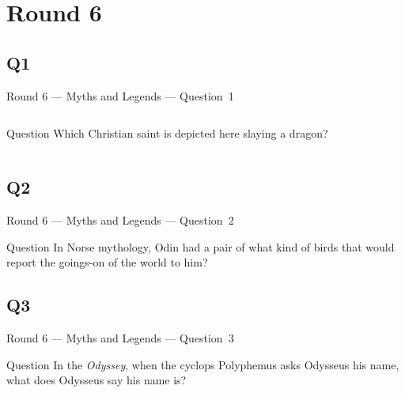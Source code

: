\documentclass[11pt]{beamer}
\begin{document}
\section{Round 6}
\subsection*{Q1}
\begin{frame}[t]{Round 6 --- Myths and Legends --- \mbox{Question 1}}
\vspace{-0.5em}
\begin{columns}[T,totalwidth=\linewidth]
\begin{column}{0.32\linewidth}
\begin{block}{Question}
Which Christian saint is depicted here slaying a dragon?
\end{block}
\end{column}
\begin{column}{0.65\linewidth}
\begin{center}
\texttt{[image: \{Images/georgedragon]}.jpg}
\end{center}
\end{column}
\end{columns}
\end{frame}
\subsection*{Q2}
\begin{frame}[t]{Round 6 --- Myths and Legends --- \mbox{Question 2}}
\vspace{-0.5em}
\begin{block}{Question}
In Norse mythology, Odin had a pair of what kind of birds that would report the goings-on of the world to him?
\end{block}
\end{frame}
\subsection*{Q3}
\begin{frame}[t]{Round 6 --- Myths and Legends --- \mbox{Question 3}}
\vspace{-0.5em}
\begin{block}{Question}
In the \emph{Odyssey}, when the cyclops Polyphemus asks Odysseus his name, what does Odysseus say his name is?
\end{block}
\end{frame}
\end{document}
